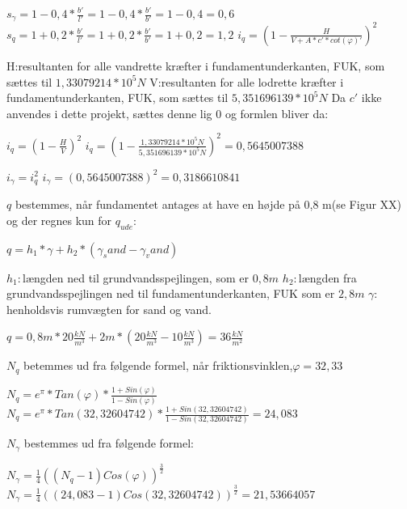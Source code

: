 \begin{center}
	$s_\gamma=1-0,\!4*\frac{b'}{l'}=1-0,\!4*\frac{b'}{b'}=1-0,\!4=0,\!6$
	$s_q=1+0,\!2*\frac{b'}{l'}=1+0,\!2*\frac{b'}{b'}=1+0,\!2=1,\!2$
	\newline
	$i_q=(1-\frac{H}{V+A*c'*cot(\varphi)'})^2$
\end{center}

H:resultanten for alle vandrette kræfter i fundamentunderkanten, FUK, som sættes til $1,\!33079214*10^5N$
V:resultanten for alle lodrette kræfter i fundamentunderkanten, FUK, som sættes til $5,\!351696139*10^5N$
\newline
\newline
Da $c'$ ikke anvendes i dette projekt, sættes denne lig 0 og formlen bliver da:
\begin{center}
	$i_q=(1-\frac{H}{V})^2$
	$i_q=(1-\frac{1,\!33079214*10^5N}{5,\!351696139*10^5N})^2=0,\!5645007388$
\end{center}

\begin{center}
	$i_\gamma=i_q^2$
	$i_\gamma=(0,\!5645007388)^2=0,\!3186610841$
\end{center}

$q$ bestemmes, når fundamentet antages at have en højde på 0,8 m(se Figur XX) og der regnes kun for $q_{ude}$:
\begin{center}
	$q=h_1*\gamma+h_2*(\gamma_sand-\gamma_vand)$
\end{center}

$h_1:$længden ned til grundvandsspejlingen, som er $0,\!8m$
$h_2:$længden fra grundvandsspejlingen ned til fundamentunderkanten, FUK som er $2,\!8m$
$\gamma:$ henholdsvis rumvægten for sand og vand.

\begin{center}
	$q=0,\!8m*20\frac{kN}{m^3}+2m*(20\frac{kN}{m^3}-10\frac{kN}{m^3})=36\frac{kN}{m^2}$
\end{center}

$N_q$ betemmes ud fra følgende formel, når friktionsvinklen,$\varphi=32,\!33$
\begin{center}
	$N_q=e^\pi*Tan(\varphi)*\frac{1+Sin(\varphi)}{1-Sin(\varphi)}$
	$N_q=e^\pi*Tan(32,\!32604742)*\frac{1+Sin(32,\!32604742)}{1-Sin(32,\!32604742)}=24,\!083$
\end{center}

$N_\gamma$ bestemmes ud fra følgende formel: 
\begin{center}
	$N_\gamma=\frac{1}{4}((N_q-1)Cos(\varphi))^\frac{3}{2}$
	$N_\gamma=\frac{1}{4}((24,\!083-1)Cos(32,\!32604742))^\frac{3}{2}=21,\!53664057$
\end{center}

